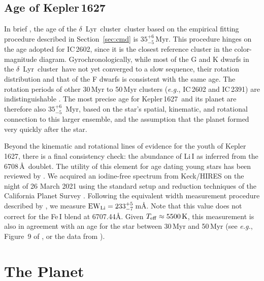 \documentclass[12pt,modern,twocolumn,tighten]{aastex63}
\newcommand{\cn}{$\delta$\ Lyr\ cluster} %
\newcommand{\sn}{Kepler\,1627} %
\begin{document}
\subsection{Age of Kepler\,1627}

In brief , the age of the \cn\ cluster based on the empirical
fitting procedure described in Section~\ref{sec:cmd} is
$35^{+6}_{-5}$\,Myr.  This procedure hinges on the age adopted for
IC\,2602, since it is the closest reference cluster in the
color-magnitude diagram.  Gyrochronologically, while most of the G and
K dwarfs in the \cn\ have not yet converged to a slow sequence, their
rotation distribution and that of the F dwarfs is consistent with the
same age.  The rotation periods of other 30\,Myr to 50\,Myr clusters
({\it e.g.}, IC\,2602 and IC\,2391) are indistinguishable
\citep{douglas_stephanie_t_2021_5131306}.  The most precise age for \sn\ and its
planet are therefore also $35^{+6}_{-5}$\, Myr, based on the star's
spatial, kinematic, and rotational connection to this larger ensemble,
and the assumption that the planet formed very quickly after the star.

Beyond the kinematic and rotational lines of evidence for the youth of
\sn, there is a final consistency check: the abundance of
Li\,\textsc{I} as inferred from the 6708\,\AA\ doublet.  The utility
of this element for age dating young stars has been reviewed by
\citet{soderblom_ages_2014}.  We acquired an iodine-free spectrum from
Keck/HIRES on the night of 26 March 2021 using the standard setup and
reduction techniques of the California Planet Survey
\citep{howard_cps_2010}.  Following the equivalent width measurement
procedure described by \citet{bouma_2021_ngc2516}, we measure ${\rm
EW}_{\rm Li} = 233^{+5}_{-7}\,$m\AA.   Note that this value does not
correct for the Fe\,\textsc{I} blend at 6707.44\AA.  Given $T_{\rm
eff} \approx 5500\,{\rm K}$, this measurement is also in agreement
with an age for the star between 30\,Myr and 50\,Myr (see {\it e.g.},
Figure~9 of \citealt{bouma_2021_ngc2516}, or the data from
\citealt{randich_gaiaeso_2018}).


\section{The Planet}
\label{sec:planet}
\end{document}
